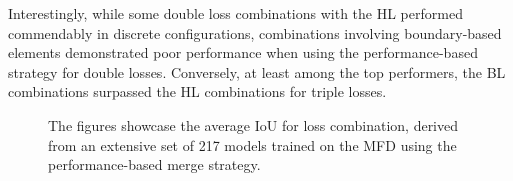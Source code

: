 Interestingly, while some double loss combinations with the HL performed commendably in discrete configurations, combinations involving boundary-based elements demonstrated poor performance when using the performance-based strategy for double losses. Conversely, at least among the top performers, the BL combinations surpassed the HL combinations for triple losses.
\begin{figure}[H]%
  \centering
  \caption[Average IoU for Loss Combination (Medaka)]{The figures showcase the average \ac{IoU} for loss combination, derived from an extensive set of 217 models trained on the \ac{MFD} using the performance-based merge strategy.}
  \label{continous_loss_combination_results_medaka_short}
\end{figure}
